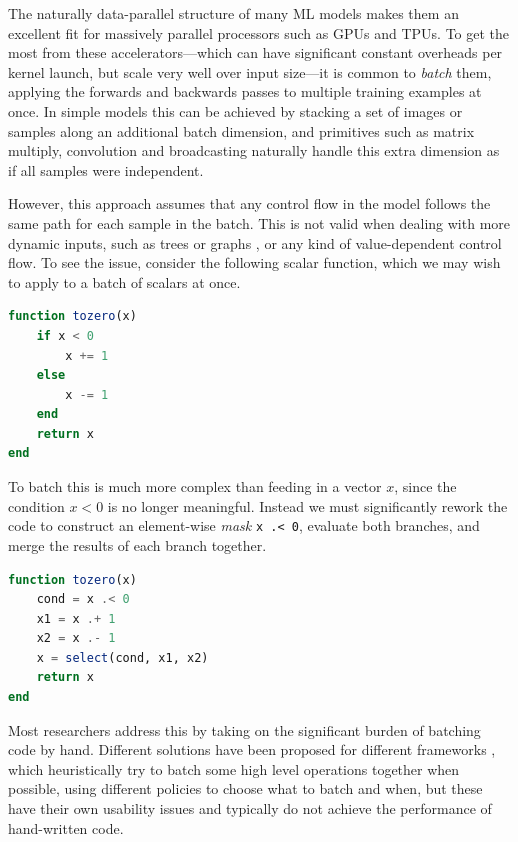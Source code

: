 \documentclass{juliacon}
\begin{document}
The naturally data-parallel structure of many ML models makes them an excellent fit for massively parallel processors such as GPUs \cite{oh2004gpu} and TPUs. To get the most from these accelerators---which can have significant constant overheads per kernel launch, but scale very well over input size---it is common to \textit{batch} them, applying the forwards and backwards passes to multiple training examples at once. In simple models this can be achieved by stacking a set of images or samples along an additional batch dimension, and primitives such as matrix multiply, convolution and broadcasting naturally handle this extra dimension as if all samples were independent.

However, this approach assumes that any control flow in the model follows the same path for each sample in the batch. This is not valid when dealing with more dynamic inputs, such as trees \cite{treelstm} or graphs \cite{graphconv}, or any kind of value-dependent control flow. To see the issue, consider the following scalar function, which we may wish to apply to a batch of scalars at once.

\begin{lstlisting}[language = Julia,
                  label={lst:not_spmd},
                  caption={\texttt{tozero()} is a simple scalar function},
                  captionpos=b]
function tozero(x)
    if x < 0
        x += 1
    else
        x -= 1
    end
    return x
end
\end{lstlisting}

To batch this is much more complex than feeding in a vector $x$, since the condition $x < 0$ is no longer meaningful. Instead we must significantly rework the code to construct an element-wise \textit{mask} \texttt{x .< 0}, evaluate both branches, and merge the results of each branch together.

\begin{lstlisting}[language = Julia,
                  label={lst:spmd},
                  caption={\texttt{spmd()} is a version of \texttt{notspmd()} that works on batches of inputs},
                  captionpos=b]
function tozero(x)
    cond = x .< 0
    x1 = x .+ 1
    x2 = x .- 1
    x = select(cond, x1, x2)
    return x
end
\end{lstlisting}

Most researchers address this by taking on the significant burden of batching code by hand. Different solutions have been proposed for different frameworks \cite{neubig2017fly} \cite{looks2017deep}, which heuristically try to batch some high level operations together when possible, using different policies to choose what to batch and when, but these have their own usability issues and typically do not achieve the performance of hand-written code.
\end{document}
